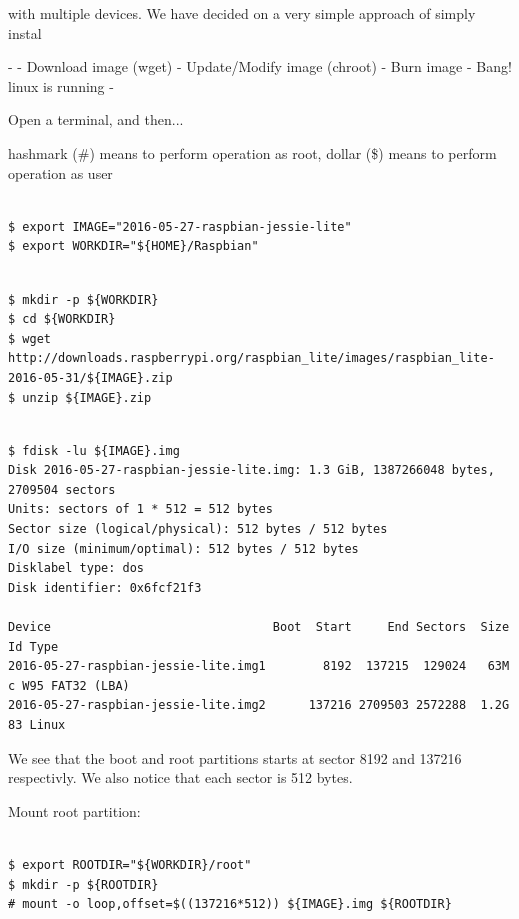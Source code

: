with multiple devices. We
have decided on a very simple approach of simply instal


- 
- Download image (wget)
- Update/Modify image (chroot)
- Burn image
- Bang! linux is running
- 

Open a terminal, and then...

hashmark (\#) means to perform operation as root, dollar (\$) means to perform operation as user

\begin{lstlisting}[]  % Start your code-block

$ export IMAGE="2016-05-27-raspbian-jessie-lite"
$ export WORKDIR="${HOME}/Raspbian"
\end{lstlisting}
\FloatBarrier



\begin{lstlisting}[]  % Start your code-block

$ mkdir -p ${WORKDIR}
$ cd ${WORKDIR}
$ wget http://downloads.raspberrypi.org/raspbian_lite/images/raspbian_lite-2016-05-31/${IMAGE}.zip
$ unzip ${IMAGE}.zip
\end{lstlisting}
\FloatBarrier


\begin{lstlisting}[]  % Start your code-block

$ fdisk -lu ${IMAGE}.img
Disk 2016-05-27-raspbian-jessie-lite.img: 1.3 GiB, 1387266048 bytes, 2709504 sectors
Units: sectors of 1 * 512 = 512 bytes
Sector size (logical/physical): 512 bytes / 512 bytes
I/O size (minimum/optimal): 512 bytes / 512 bytes
Disklabel type: dos
Disk identifier: 0x6fcf21f3

Device                               Boot  Start     End Sectors  Size Id Type
2016-05-27-raspbian-jessie-lite.img1        8192  137215  129024   63M  c W95 FAT32 (LBA)
2016-05-27-raspbian-jessie-lite.img2      137216 2709503 2572288  1.2G 83 Linux
\end{lstlisting}
\FloatBarrier

We see that the boot and root partitions starts at sector 8192 and 137216 respectivly.
We also notice that each sector is 512 bytes.


Mount root partition:
\begin{lstlisting}[]  % Start your code-block

$ export ROOTDIR="${WORKDIR}/root"
$ mkdir -p ${ROOTDIR}
# mount -o loop,offset=$((137216*512)) ${IMAGE}.img ${ROOTDIR}
\end{lstlisting}
\FloatBarrier

